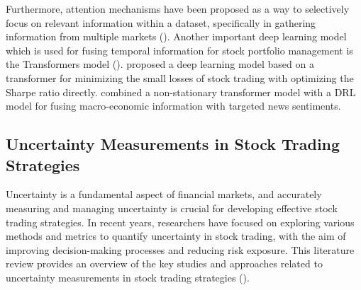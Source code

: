 Furthermore, attention mechanisms have been proposed as a way to selectively focus on relevant information within a dataset, specifically in gathering information from multiple markets (\citet{zhao2022stock}). Another important deep learning model which is used for fusing temporal information for stock portfolio management is the Transformers model (\citet{gullotto2021portfolio}). \citet{kisiel2022portfolio} proposed a deep learning model based on a transformer for minimizing the small losses of stock trading with optimizing the Sharpe ratio \citet{sharpe1998sharpe} directly. \citet{liu2023revolutionising} combined a non-stationary transformer model with a DRL model for fusing macro-economic information with targeted news sentiments.

%
%


\subsection{Uncertainty Measurements in Stock Trading Strategies}

Uncertainty is a fundamental aspect of financial markets, and accurately measuring and managing uncertainty is crucial for developing effective stock trading strategies. In recent years, researchers have focused on exploring various methods and metrics to quantify uncertainty in stock trading, with the aim of improving decision-making processes and reducing risk exposure. This literature review provides an overview of the key studies and approaches related to uncertainty measurements in stock trading strategies (\citet{abdar2021review}).


